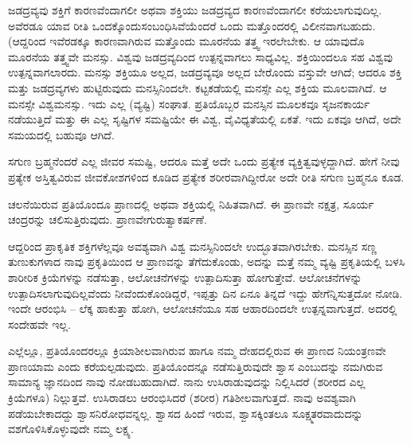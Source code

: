 \vskip 1.5pt

ಜಡದ್ರವ್ಯವು ಶಕ್ತಿಗೆ ಕಾರಣವೆಂದಾಗಲೀ ಅಥವಾ ಶಕ್ತಿಯು ಜಡದ್ರವ್ಯದ ಕಾರಣವೆಂದಾಗಲೀ ಕರೆಯಲಾಗುವುದಿಲ್ಲ. ಅವೆರಡೂ ಯಾವ ರೀತಿ ಒಂದಕ್ಕೊಂದು\break ಸಂಬಂಧಿಸಿವೆಯೆಂದರೆ ಒಂದು ಮತ್ತೊಂದರಲ್ಲಿ ವಿಲೀನವಾಗಬಹುದು. (ಆದ್ದರಿಂದ ಇವೆರಡಕ್ಕೂ ಕಾರಣವಾಗಿರುವ ಮತ್ತೊಂದು ಮೂರನೆಯ ತತ್ತ್ವ ಇರಲೇಬೇಕು. ಆ ಯಾವುದೊ ಮೂರನೆಯ ತತ್ತ್ವವೇ ಮನಸ್ಸು. ವಿಶ್ವವು ಜಡದ್ರವ್ಯದಿಂದ ಉತ್ಪನ್ನವಾಗಲು ಸಾಧ್ಯವಿಲ್ಲ. ಶಕ್ತಿಯಿಂದಲೂ ಸಹ ವಿಶ್ವವು ಉತ್ಪನ್ನವಾಗಲಾರದು. ಮನಸ್ಸು ಶಕ್ತಿಯೂ ಅಲ್ಲದ, ಜಡದ್ರವ್ಯವೂ ಅಲ್ಲದ ಬೇರೊಂದು ವಸ್ತುವೇ ಆಗಿದೆ; ಆದರೂ ಶಕ್ತಿ ಮತ್ತು ಜಡದ್ರವ್ಯಗಳು ಹುಟ್ಟಿರುವುದು ಮನಸ್ಸಿನಿಂದಲೇ. ಕಟ್ಟಕಡೆಯಲ್ಲಿ ಮನಸ್ಸೇ ಎಲ್ಲ ಶಕ್ತಿಯ ಮೂಲವಾಗಿದೆ. ಆ ಮನಸ್ಸೇ ವಿಶ್ವಮನಸ್ಸು. ಇದು ಎಲ್ಲ (ವ್ಯಷ್ಟಿ) ಸಂಘಾತ. ಪ್ರತಿಯೊಬ್ಬರ ಮನಸ್ಸಿನ ಮೂಲಕವೂ ಸೃಜನಕಾರ್ಯ ನಡೆಯುತ್ತಿದೆ ಮತ್ತು ಈ ಎಲ್ಲ ಸೃಷ್ಟಿಗಳ ಸಮಷ್ಟಿಯೇ ಈ ವಿಶ್ವ, ವೈವಿಧ್ಯತೆಯಲ್ಲಿ ಏಕತೆ. ಇದು ಏಕವೂ ಆಗಿದೆ, ಅದೇ ಸಮಯದಲ್ಲಿ ಬಹುವೂ ಆಗಿದೆ.

\vskip 1.5pt

ಸಗುಣ ಬ್ರಹ್ಮನೆಂದರೆ ಎಲ್ಲ ಜೀವರ ಸಮಷ್ಟಿ, ಆದರೂ ಮತ್ತೆ ಅದೇ ಒಂದು ಪ್ರತ್ಯೇಕ ವ್ಯಕ್ತಿತ್ವವುಳ್ಳದ್ದಾಗಿದೆ. ಹೇಗೆ ನೀವು ಪ್ರತ್ಯೇಕ ಅಸ್ತಿತ್ವವಿರುವ ಜೀವಕೋಶಗಳಿಂದ ಕೂಡಿದ ಪ್ರತ್ಯೇಕ ಶರೀರವಾಗಿದ್ದೀರೋ ಅದೇ ರೀತಿ ಸಗುಣ ಬ್ರಹ್ಮನೂ ಕೂಡ.

\vskip 1.5pt

ಚಲನೆಯಿರುವ ಪ್ರತಿಯೊಂದೂ ಪ್ರಾಣದಲ್ಲಿ ಅಥವಾ ಶಕ್ತಿಯಲ್ಲಿ ನಿಹಿತವಾಗಿದೆ. ಈ ಪ್ರಾಣವೇ ನಕ್ಷತ್ರ, ಸೂರ್ಯ ಚಂದ್ರರನ್ನು ಚಲಿಸುತ್ತಿರುವುದು. ಪ್ರಾಣವೇ\break ಗುರುತ್ವಾಕರ್ಷಣೆ.

\vskip 1.5pt

ಆದ್ದರಿಂದ ಪ್ರಾಕೃತಿಕ ಶಕ್ತಿಗಳೆಲ್ಲವೂ ಅವಶ್ಯವಾಗಿ ವಿಶ್ವ ಮನಸ್ಸಿನಿಂದಲೇ ಉದ್ಭೂತವಾಗಿರಬೇಕು. ಮನಸ್ಸಿನ ಸಣ್ಣ ತುಣುಕುಗಳಾದ ನಾವು ಪ್ರಕೃತಿಯಿಂದ ಆ ಪ್ರಾಣವನ್ನು ತೆಗೆದುಕೊಂಡು, ಅದನ್ನು ಮತ್ತೆ ನಮ್ಮ ವ್ಯಷ್ಟಿ ಪ್ರಕೃತಿಯಲ್ಲಿ ಬಳಸಿ ಶಾರೀರಿಕ ಕ್ರಿಯೆಗಳನ್ನು ನಡೆಸುತ್ತಾ, ಆಲೋಚನೆಗಳನ್ನು ಉತ್ಪಾದಿಸುತ್ತಾ ಹೋಗುತ್ತೇವೆ. ಆಲೋಚನೆಗಳನ್ನು ಉತ್ಪಾದಿಸಲಾಗುವುದಿಲ್ಲವೆಂದು ನೀವೆಂದುಕೊಂಡಿದ್ದರೆ, ಇಪ್ಪತ್ತು ದಿನ ಏನೂ ತಿನ್ನದೆ ಇದ್ದು ಹೇಗೆನ್ನಿಸುತ್ತದೋ ನೋಡಿ. ಇಂದೇ ಆರಂಭಿಸಿ – ಲೆಕ್ಕ ಹಾಕುತ್ತಾ ಹೋಗಿ, ಆಲೋಚನೆಯೂ ಸಹ ಆಹಾರದಿಂದಲೇ ಉತ್ಪನ್ನವಾಗುತ್ತದೆ. ಅದರಲ್ಲಿ ಸಂದೇಹವೇ ಇಲ್ಲ.

\vskip 1.5pt

ಎಲ್ಲೆಲ್ಲೂ, ಪ್ರತಿಯೊಂದರಲ್ಲೂ ಕ್ರಿಯಾಶೀಲವಾಗಿರುವ ಹಾಗೂ ನಮ್ಮ ದೇಹದಲ್ಲಿರುವ ಈ ಪ್ರಾಣದ ನಿಯಂತ್ರಣವೇ ಪ್ರಾಣಯಾಮ ಎಂದು ಕರೆಯಲ್ಪಡುವುದು. ಪ್ರತಿಯೊಂದನ್ನೂ ನಡೆಸುತ್ತಿರುವುದೇ ಶ್ವಾಸ ಎಂಬುದನ್ನು ನಮಗಿರುವ ಸಾಮಾನ್ಯ ಜ್ಞಾನದಿಂದ ನಾವು ನೋಡಬಹುದಾಗಿದೆ. ನಾನು ಉಸಿರಾಡುವುದನ್ನು ನಿಲ್ಲಿಸಿದರೆ (ಶರೀರದ ಎಲ್ಲ ಕ್ರಿಯೆಗಳೂ) ನಿಲ್ಲುತ್ತವೆ. ಉಸಿರಾಡಲು ಆರಂಭಿಸಿದರೆ (ಶರೀರ) ಗತಿಶೀಲವಾಗುತ್ತದೆ. ನಾವು ಅವಶ್ಯವಾಗಿ ಪಡೆಯಬೇಕಾದದ್ದು ಶ್ವಾಸನಿರೋಧವನ್ನಲ್ಲ. ಶ್ವಾಸದ ಹಿಂದೆ ಇರುವ, ಶ್ವಾಸಕ್ಕಿಂತಲೂ ಸೂಕ್ಷ್ಮತರವಾದುದನ್ನು ವಶಗೊಳಿಸಿಕೊಳ್ಳುವುದೇ ನಮ್ಮ ಲಕ್ಷ್ಯ.

\vskip 1.5pt

